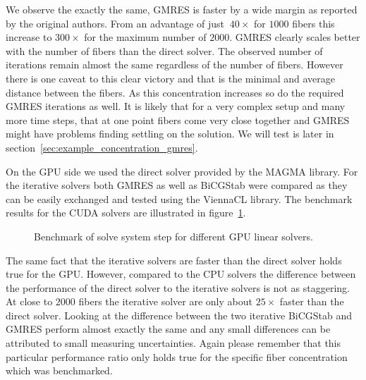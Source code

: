 \documentclass[a4paper,11pt]{kth-mag}
\begin{document}
We observe the exactly the same, GMRES is faster by a wide margin as reported by the original authors. From an advantage of just $~40×$ for $1000$ fibers this increase to $300×$ for the maximum number of $2000$. GMRES clearly scales better with the number of fibers than the direct solver. The observed number of iterations remain almost the same regardless of the number of fibers. However there is one caveat to this clear victory and that is the minimal and average distance between the fibers. As this concentration increases so do the required GMRES iterations as well. It is likely that for a very complex setup and many more time steps, that at one point fibers come very close together and GMRES might have problems finding settling on the solution. We will test is later in section~\ref{sec:example_concentration_gmres}.

On the GPU side we used the direct solver provided by the MAGMA library. For the iterative solvers both GMRES as well as BiCGStab were compared as they can be easily exchanged and tested using the ViennaCL library. The benchmark results for the CUDA solvers are illustrated in figure~\ref{fig:bench_cuda_solvers}.

\begin{figure}[!htbp]
  \centering
  \caption{Benchmark of solve system step for different GPU linear solvers.}
  \label{fig:bench_cuda_solvers}
\end{figure}

The same fact that the iterative solvers are faster than the direct solver holds true for the GPU. However, compared to the CPU solvers the difference between the performance of the direct solver to the iterative solvers is not as staggering. At close to $2000$ fibers the iterative solver are only about $25×$ faster than the direct solver. Looking at the difference between the two iterative BiCGStab and GMRES perform almost exactly the same and any small differences can be attributed to small measuring uncertainties. Again please remember that this particular performance ratio only holds true for the specific fiber concentration which was benchmarked.
\end{document}
